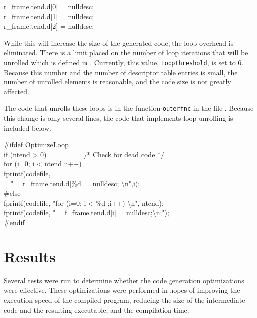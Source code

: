 \goodbreak
\begin{iconcode}
r\_frame.tend.d[0] = nulldesc;\\
r\_frame.tend.d[1] = nulldesc;\\
r\_frame.tend.d[2] = nulldesc;\\
\end{iconcode}

While this will increase the size of the generated code, the loop
overhead is eliminated. There is a limit placed on the number of loop
iterations that will be unrolled which is defined in
. Currently, this value, \texttt{LoopThreshold}, is
set to 6. Because this number and the number of descriptor table
entries is small, the number of unrolled elements is reasonable, and
the code size is not greatly affected.


The code that unrolls these loops is in the function \texttt{outerfnc}
in the file . Because this change is only several
lines, the code that implements loop unrolling is included below.

\goodbreak
\begin{iconcode}
\#ifdef OptimizeLoop\\
\> if (ntend > 0) \ \ \ \ \ \ \ \ \ \ /* Check for dead code */\\
\> \>for (i=0; i < ntend ;i++)\\
\> \>\>fprintf(codefile,\\
\> \>\>\>\>\ \ " \ \ r\_frame.tend.d[\%d] = nulldesc; {\textbackslash}n",i);\\
\#else\\
\> fprintf(codefile, "for (i=0; i < \%d ;i++) {\textbackslash}n", ntend);\\
\> fprintf(codefile, " \ \ f\_frame.tend.d[i] = nulldesc;{\textbackslash}n;");\\
\#endif\\
\end{iconcode}

\section{Results}

Several tests were run to determine whether the code generation
optimizations were effective. These optimizations were performed in
hopes of improving the execution speed of the compiled program,
reducing the size of the intermediate code and the resulting
executable, and the compilation time.

